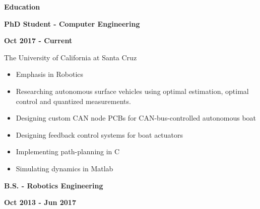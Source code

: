 \documentclass[paper=a4,fontsize=11pt]{article} %
\def \sectionSpace      {0.7cm}     %
\def \subSectionSpace   {0.3cm}     %
\def \leftColSpace      {0.12}      %
\def \middleColSpace    {0.675}     %
\def \bigMiddleColSpace {0.875}     %
\def \rightColSpace     {0.25}      %
\begin{document}
    \vspace{\sectionSpace}
    \noindent
    \begin{minipage}[t]{\leftColSpace\linewidth}
        \noindent \textbf{Education}
    \end{minipage}
    \begin{minipage}[t]{\middleColSpace\linewidth}
        \noindent \textbf{PhD Student - Computer Engineering}
    \end{minipage}
    \begin{minipage}[t]{\rightColSpace\linewidth}
        \noindent \textbf{Oct 2017 - Current}
    \end{minipage}
    \begin{minipage}[t]{\leftColSpace\linewidth}
        \hfill
    \end{minipage}
    \begin{minipage}[t]{\bigMiddleColSpace\linewidth}
        \noindent The University of California at Santa Cruz
        \begin{itemize}[noitemsep,topsep=0pt]
            \item Emphasis in Robotics
            \item Researching autonomous surface vehicles using optimal estimation, optimal control and quantized measurements.
            \item Designing custom CAN node PCBs for CAN-bus-controlled autonomous boat
            \item Designing feedback control systems for boat actuators
            \item Implementing path-planning in C
            \item Simulating dynamics in Matlab
        \end{itemize}
    \end{minipage}

    \noindent
    \begin{minipage}[t]{\leftColSpace\linewidth}
        \hfill
    \end{minipage}
    \begin{minipage}[t]{\middleColSpace\linewidth}
        \vspace{\subSectionSpace}
        \noindent \textbf{B.S. - Robotics Engineering}
    \end{minipage}
    \begin{minipage}[t]{\rightColSpace\linewidth}
        \vspace{\subSectionSpace}
        \noindent \textbf{Oct 2013 - Jun 2017}
    \end{minipage}
\end{document}
